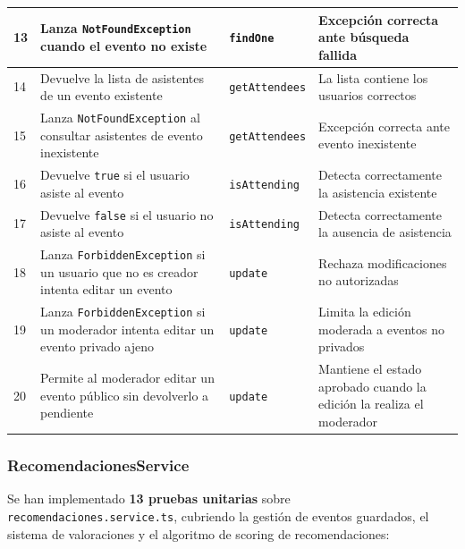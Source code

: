 \begin{longtable}{|p{0.5cm}|p{5.5cm}|p{3.8cm}|p{4.5cm}|}
\hline
13 & Lanza \texttt{NotFoundException} cuando el evento no existe & \texttt{findOne} & Excepción correcta ante búsqueda fallida \\
\hline
14 & Devuelve la lista de asistentes de un evento existente & \texttt{getAttendees} & La lista contiene los usuarios correctos \\
\hline
15 & Lanza \texttt{NotFoundException} al consultar asistentes de evento inexistente & \texttt{getAttendees} & Excepción correcta ante evento inexistente \\
\hline
16 & Devuelve \texttt{true} si el usuario asiste al evento & \texttt{isAttending} & Detecta correctamente la asistencia existente \\
\hline
17 & Devuelve \texttt{false} si el usuario no asiste al evento & \texttt{isAttending} & Detecta correctamente la ausencia de asistencia \\
\hline
18 & Lanza \texttt{ForbiddenException} si un usuario que no es creador intenta editar un evento & \texttt{update} & Rechaza modificaciones no autorizadas \\
\hline
19 & Lanza \texttt{ForbiddenException} si un moderador intenta editar un evento privado ajeno & \texttt{update} & Limita la edición moderada a eventos no privados \\
\hline
20 & Permite al moderador editar un evento público sin devolverlo a pendiente & \texttt{update} & Mantiene el estado aprobado cuando la edición la realiza el moderador \\
\hline
\end{longtable}

\subsubsection{RecomendacionesService}

Se han implementado \textbf{13 pruebas unitarias} sobre \texttt{recomendaciones.service.ts}, cubriendo la gestión de eventos guardados, el sistema de valoraciones y el algoritmo de scoring de recomendaciones:

